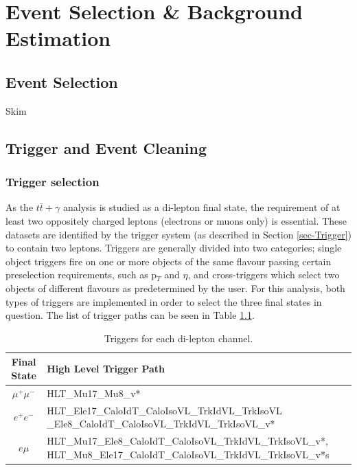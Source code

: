 \chapter{Event Selection \& Background Estimation} \label{chap-EventSelection}

\section{Event Selection}

Skim

\section{Trigger and Event Cleaning}

\subsection{Trigger selection}

As the $t\bar{t}+\gamma$ analysis is studied as a di-lepton final state, the requirement of at least two oppositely charged leptons (electrons or muons only) is essential. These datasets are identified by the trigger system (as described in Section \ref{sec-Trigger}) to contain two leptons. Triggers are generally divided into two categories; single object triggers fire on one or more objects of the same flavour passing certain preselection requirements, such as p$_T$ and $\eta$, and cross-triggers which select two objects of different flavours as predetermined by the user. For this analysis, both types of triggers are implemented in order to select the three final states in question. The list of trigger paths can be seen in Table \ref{tab-HLTriggers}. 

\begin{table} \label{tab-HLTriggers}
\begin{center}
\begin{tabular}{|c|p{11.5cm}|}
\hline
	\textbf{Final State} & \textbf{High Level Trigger Path} \\
\hline
	$\mu^+\mu^-$ & HLT\_Mu17\_Mu8\_v* \\
	$e^+e^-$ & HLT\_Ele17\_CaloIdT\_CaloIsoVL\_TrkIdVL\_TrkIsoVL
				\_Ele8\_CaloIdT\_CaloIsoVL\_TrkIdVL\_TrkIsoVL\_v* \\
	$e\mu$ & HLT\_Mu17\_Ele8\_CaloIdT\_CaloIsoVL\_TrkIdVL\_TrkIsoVL\_v*, HLT\_Mu8\_Ele17\_CaloIdT\_CaloIsoVL\_TrkIdVL\_TrkIsoVL\_v*s \\
\hline	
\end{tabular}
\caption{Triggers for each di-lepton channel.}
\end{center}
\end{table}

